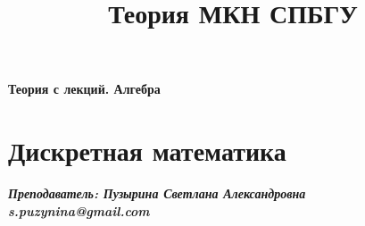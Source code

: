 \documentclass{article}
\title{Теория МКН СПБГУ}
\begin{document}
\begin{titlepage}
\begin{center}
{\LARGE \textbf{Теория с лекций. Алгебра}}
\end{center}
\begin{figure}[h]
\centering
\end{figure}
\end{titlepage}

\begin{titlepage}
\clearpage
\textcolor{blue}{\tableofcontents}
\end{titlepage}

\section{Дискретная математика}
\begin{center}
\textit{\textbf{Преподаватель: Пузырина Светлана Александровна\\
s.puzynina@gmail.com}}
\end{center}
\end{document}
